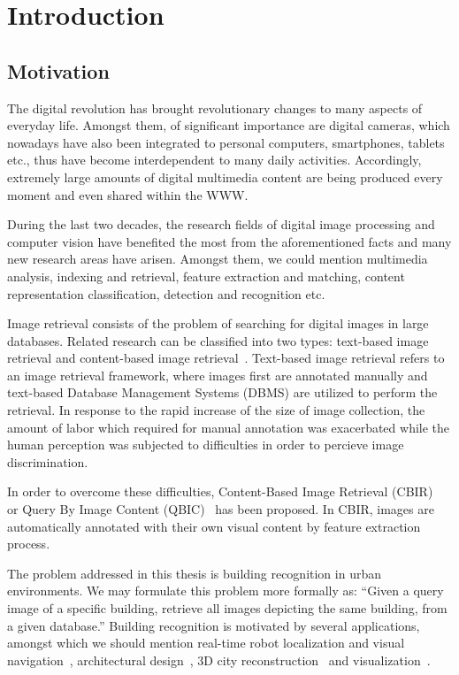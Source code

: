 \chapter{Introduction}
\section{Motivation}
The digital revolution has brought revolutionary changes to many aspects of everyday life. Amongst them, of significant importance are digital cameras, which nowadays have also been integrated to personal computers, smartphones, tablets etc., thus have become interdependent to many daily activities. Accordingly, extremely large amounts of digital multimedia content are being produced every moment and even shared within the WWW.

During the last two decades, the research fields of digital image processing and computer vision have benefited the most from the aforementioned facts and many new research areas have arisen. Amongst them, we could mention multimedia analysis, indexing and retrieval, feature extraction and matching, content representation classification, detection and recognition etc.

Image retrieval consists of the problem of searching for digital images in large databases. Related research can be classified into two types: text-based image retrieval and content-based image retrieval~\cite{rui1999image}. Text-based image retrieval refers to an image retrieval framework, where images first are annotated manually and text-based Database Management Systems (DBMS) are utilized to perform the retrieval. In response to the rapid increase of the size of image collection, the amount of labor which required for manual annotation was exacerbated while the human perception was subjected to difficulties in order to percieve image discrimination.

In order to overcome these difficulties, Content-Based Image Retrieval (CBIR)~\cite{gudivada1995content} or Query By Image Content (QBIC)~\cite{flickner1995query} has been proposed. In CBIR, images are automatically annotated with their own visual content by feature extraction process.

The problem addressed in this thesis is building recognition in urban environments. We may formulate this problem more formally as: ``Given a query image of a specific building, retrieve all images depicting the same building, from a given database.'' Building recognition is motivated by several applications, amongst which we should mention real-time robot localization  and visual navigation~\cite{se2002mobile}, architectural design~\cite{kato1992database}, 3D city reconstruction~\cite{agarwal2009building} and visualization~\cite{glander2009abstract}.

